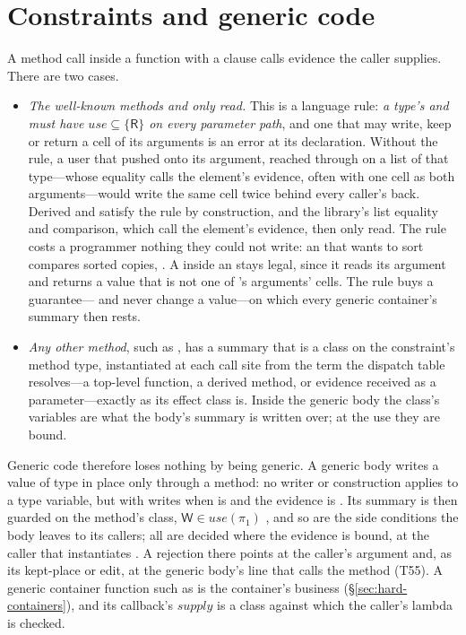 \section{Constraints and generic code}
\label{sec:inf-generic}

A method call  inside a function with a  clause calls evidence the caller
supplies. There are two cases.
\begin{itemize}
\item \emph{The well-known methods  and  only read.} This is a language rule:
\emph{a type's  and  must have $\mathit{use} \subseteq \{\mathsf{R}\}$ on every
parameter path}, and one that may write, keep or return a cell of its arguments is an error at its
declaration. Without the rule, a user  that pushed onto its argument, reached through
\code{==} on a list of that type---whose equality calls the element's evidence, often with one cell as
both arguments---would write the same cell twice behind every caller's back. Derived  and
 satisfy the rule by construction, and the library's list equality and comparison, which
call the element's evidence, then only read. The rule costs a programmer nothing they could not write:
an  that wants to sort compares sorted copies, . A
 inside an  stays legal, since it reads its argument and returns a value that
is not one of 's arguments' cells. The rule buys a guarantee---\code{==} and \code{<} never
change a value---on which every generic container's summary then rests.
\item \emph{Any other method}, such as , has a summary that is a class on
the constraint's method type, instantiated at each call site from the term the dispatch table
resolves---a top-level function, a derived method, or evidence received as a parameter---exactly as its
effect class is. Inside the generic body the class's variables are what the body's summary is written
over; at the use they are bound.
\end{itemize}

Generic code therefore loses nothing by being generic. A generic body writes a value of type  in
place only through a method: no writer or construction applies to a type variable, but
 with  writes  when  is
 and the evidence is . Its summary is then guarded on the method's class,
$\mathsf{W} \in \mathit{use}(\pi_1)$ , and so are the side conditions the body
leaves to its callers; all are decided where the evidence is bound, at the caller that instantiates
. A rejection there points at the caller's argument and, as its kept-place or edit, at the
generic body's line that calls the method (T55). A generic container function such as
 is the container's business (\S\ref{sec:hard-containers}), and
its callback's $\mathit{supply}$ is a class against which the caller's lambda is checked.

